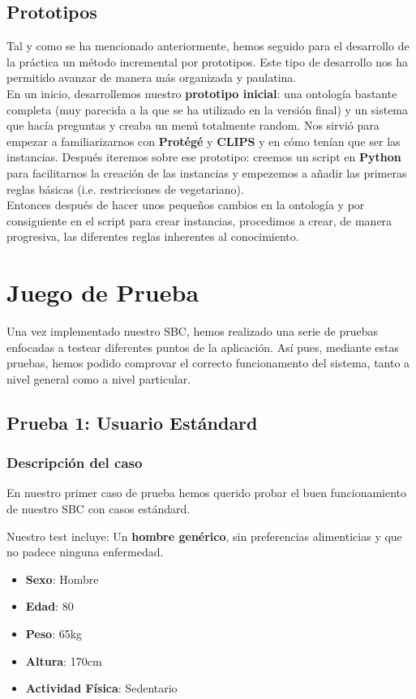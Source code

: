 \documentclass[12]{article}
\begin{document}
\subsection{Prototipos}
Tal y como se ha mencionado anteriormente, hemos seguido para el desarrollo de la práctica un método incremental por prototipos. Este tipo de desarrollo nos ha permitido avanzar de manera más organizada y paulatina. 
\\
En un inicio, desarrollemos nuestro \textbf{prototipo inicial}: una ontología bastante completa (muy parecida a la que se ha utilizado en la versión final) y un sistema que hacía preguntas y creaba un menú totalmente random.  Nos sirvió para empezar a familiarizarnos con \textbf{Protégé} y \textbf{CLIPS} y en cómo tenían que ser las instancias. Después iteremos sobre ese prototipo: creemos un script en \textbf{Python} para facilitarnos la creación de las instancias y empezemos a añadir las primeras reglas básicas (i.e. restricciones de vegetariano). 
\\
Entonces después de hacer unos pequeños cambios en la ontología y por consiguiente en el script para crear instancias, procedimos a crear, de manera progresiva, las diferentes reglas inherentes al conocimiento.  

\section{Juego de Prueba}
Una vez implementado nuestro SBC, hemos realizado una serie de pruebas enfocadas a testear diferentes puntos de la aplicación. Así pues, mediante estas pruebas, hemos podido comprovar el correcto funcionamento del sistema, tanto a nivel general como a nivel particular.

\subsection{Prueba 1: Usuario Estándard}
\subsubsection{Descripción del caso}
En nuestro primer caso de prueba hemos querido probar el buen funcionamiento de nuestro SBC con casos estándard. 
\medskip

Nuestro test incluye:
Un \textbf{hombre genérico}, sin preferencias alimenticias y que no padece ninguna enfermedad.

\begin{itemize}
\item \textbf{Sexo}: Hombre
\item \textbf{Edad}: 80
\item \textbf{Peso}: 65kg
\item \textbf{Altura}: 170cm
\item \textbf{Actividad Física}: Sedentario
\end{itemize}
\end{document}
